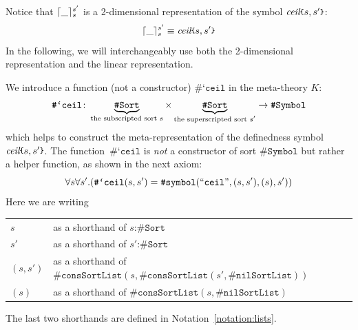 \documentclass[UTF8,11pt]{article}
\theoremstyle{plain}
\theoremstyle{definition}
\theoremstyle{remark}
\DeclarePairedDelimiter{\ceil}{\lceil}{\rceil}
\newcommand{\cln}{\texttt{:}}
\newcommand{\itceil}{\textit{ceil}}
\newcommand{\parametric}[2]{{#1}\raisebox{.2ex}{\texttt{\footnotesize{\{}}}#2\raisebox{.2ex}{\texttt{\footnotesize{\}}}}}
\newcommand{\sharpsymbol}{\#}
\newcommand{\KSort}{\texttt{\sharpsymbol Sort}}
\newcommand{\KSymbol}{\texttt{\sharpsymbol Symbol}}
\newcommand{\Ksymbol}{\texttt{\sharpsymbol symbol}}
\newcommand{\KSymbolceil}{\texttt{\sharpsymbol `ceil}}
\newcommand{\KnilKSortList}{\texttt{\sharpsymbol nilSortList}}
\newcommand{\KconsKSortList}{\texttt{\sharpsymbol consSortList}}
\newcommand{\qquottt}[1]{\textrm{``\texttt{#1}''}}
\begin{document}
Notice that $\ceil{\_}_s^{s'}$ is a 2-dimensional representation of the symbol 
$\parametric{\itceil}{s,s'}$:
$$ \ceil{\_}_s^{s'} \equiv \parametric{\itceil}{s,s'} $$
In the following, we will interchangeably use both the 2-dimensional 
representation and the linear representation.

We introduce a function (not a constructor) $\KSymbolceil$ in the meta-theory 
$K$:
\begin{equation*}
 \KSymbolceil \colon 
 \underbrace{\KSort}_\text{the subscripted sort $s$}
 \times 
 \underbrace{\KSort}_\text{the superscripted sort $s'$} \to \KSymbol \\
\end{equation*}
which helps to construct the meta-representation of the definedness symbol 
$\parametric{\itceil}{s,s'}$.
The function~$\KSymbolceil$ is \emph{not} a constructor of sort $\KSymbol$ but 
rather a helper function, as shown in the next axiom:
\begin{equation*}
 \forall s \forall s' . (\KSymbolceil(s, s') = \Ksymbol(\qquottt{ceil}, (s,s'), 
 (s), s'))
\end{equation*}
Here we are writing
\begin{center}
\begin{tabular}{ll}
	$s$ & as a shorthand of $s \cln \KSort$ \\
	$s'$ & as a shorthand of $s' \cln \KSort$ \\
    $(s,s')$ & as a shorthand of 
    $\KconsKSortList(s,\KconsKSortList(s',\KnilKSortList))$ \\
    $(s)$ & as a shorthand of $\KconsKSortList(s,\KnilKSortList)$
\end{tabular}
\end{center}
The last two shorthands are defined in Notation~\ref{notation:lists}.
\end{document}
